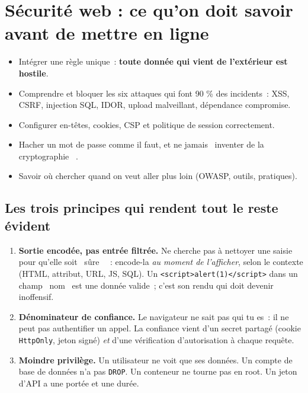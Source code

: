 \documentclass[12pt,a4paper,twoside,openright]{book}
\begin{document}
\chapter{S\'ecurit\'e web : ce qu'on doit savoir avant de mettre en ligne}
\label{ch-js-secu}

\begin{objectif}
\begin{itemize}
  \item Int\'egrer une r\`egle unique~: \textbf{toute donn\'ee qui vient de l'ext\'erieur est hostile}.
  \item Comprendre et bloquer les six attaques qui font 90 \% des incidents~: XSS, CSRF,
        injection SQL, IDOR, upload malveillant, d\'ependance compromise.
  \item Configurer en-t\^etes, cookies, CSP et politique de session correctement.
  \item Hacher un mot de passe comme il faut, et ne jamais \og ~inventer de la cryptographie~ \fg{}.
  \item Savoir o\`u chercher quand on veut aller plus loin (OWASP, outils, pratiques).
\end{itemize}
\end{objectif}

\section{Les trois principes qui rendent tout le reste \'evident}

\begin{enumerate}
  \item \textbf{Sortie encod\'ee, pas entr\'ee filtr\'ee.} Ne cherche pas \`a nettoyer une saisie pour
        qu'elle soit \og ~s\^ure~ \fg{}~: encode-la \emph{au moment de l'afficher}, selon le contexte
        (HTML, attribut, URL, JS, SQL). Un \verb|<script>alert(1)</script>| dans un champ \og ~nom~ \fg{}
        est une donn\'ee valide~; c'est son rendu qui doit devenir inoffensif.
  \item \textbf{D\'enominateur de confiance.} Le navigateur ne sait pas qui tu es~: il ne peut pas
        authentifier un appel. La confiance vient d'un secret partag\'e (cookie \verb|HttpOnly|,
        jeton sign\'e) \emph{et} d'une v\'erification d'autorisation \`a chaque requ\^ete.
  \item \textbf{Moindre privil\`ege.} Un utilisateur ne voit que ses donn\'ees. Un compte de base de
        donn\'ees n'a pas \verb|DROP|. Un conteneur ne tourne pas en root. Un jeton d'API a une
        port\'ee et une dur\'ee.
\end{enumerate}
\end{document}

